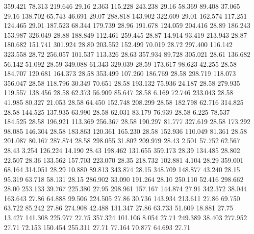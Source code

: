  359.421   78.313  219.646        29.16
   2.363  115.228  243.238        29.16
  58.369   89.408   37.065        29.16
 138.702   65.743   46.691        29.07
 288.818  143.902  322.609        29.01
 162.574  117.251  124.465        29.01
 187.523   68.344  179.739        28.96
 191.678  124.059  204.416        28.89
 186.243  153.987  326.049        28.88
 188.849  112.461  259.445        28.87
  14.914   93.419  213.943        28.87
 180.682  151.741  301.924        28.80
 203.552  152.499   70.019        28.72
 297.400  116.142  323.558        28.72
 256.057  101.537  113.326        28.63
 357.934   89.728  305.021        28.61
 136.682   56.142   51.092        28.59
 349.088   61.343  329.039        28.59
 173.617   98.623   42.255        28.58
 184.707  120.681  164.373        28.58
 353.499  107.260  186.769        28.58
 298.719  118.073  356.047        28.58
 118.796   30.349   70.651        28.58
 193.132   75.936   24.187        28.58
 279.935  119.557  138.456        28.58
  62.373   56.909   85.647        28.58
   6.169   72.746  233.043        28.58
  41.985   80.327   21.053        28.58
  64.450  152.748  208.299        28.58
 182.798   62.716  314.825        28.58
 144.525  137.935   63.990        28.58
  62.031   83.179   76.939        28.58
   6.225   78.537  184.525        28.58
 196.921  113.369  256.367        28.58
 190.297   81.777  327.619        28.58
 173.292   98.085  146.304        28.58
 183.863  120.361  165.230        28.58
 152.936  110.049   81.361        28.58
 201.087   80.167  287.874        28.58
 298.055   31.802  209.979        28.43
   2.501   57.752   62.567        28.43
   3.254  126.224   14.190        28.43
 198.462  131.655  359.173        28.39
 134.485   28.802   22.507        28.36
 133.562  157.703  223.070        28.35
 218.732  102.881    4.104        28.29
 359.001   68.164  314.051        28.29
  10.880   89.813  343.874        28.15
 348.709  148.877   43.240        28.15
  95.319   63.718   58.131        28.15
 286.902   33.090  191.264        28.10
 250.110   52.416  298.662        28.00
 253.133   39.767  225.380        27.95
 298.961  157.167  144.874        27.91
 342.372   38.044  163.643        27.86
  64.888   99.506  224.505        27.86
  30.736  143.934  213.611        27.86
  69.750   63.722   85.242        27.86
 274.908   42.488  131.347        27.86
  63.733   51.609   18.881        27.75
  13.427  141.308  225.977        27.75
 357.324  101.106    8.054        27.71
 249.389   38.403  277.952        27.71
  72.153  150.454  255.311        27.71
  77.164   70.877   64.693        27.71
